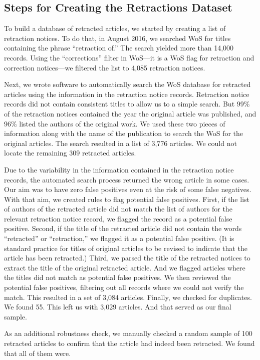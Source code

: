 \documentclass[12pt]{article}
\begin{document}
\subsection{Steps for Creating the Retractions Dataset}
\label{data_collection}
To build a database of retracted articles, we started by creating a list of retraction notices. To do that, in August 2016, we searched WoS for titles containing the phrase ``retraction of.'' The search yielded more than 14,000 records. Using the ``corrections'' filter in WoS---it is a WoS flag for retraction and correction notices---we filtered the list to 4,085 retraction notices.

Next, we wrote software to automatically search the WoS database for retracted articles using the information in the retraction notice records. Retraction notice records did not contain consistent titles to allow us to a simple search. But 99\% of the retraction notices contained the year the original article was published, and 96\% listed the authors of the original work. We used these two pieces of information along with the name of the publication to search the WoS for the original articles. The search resulted in a list of 3,776 articles. We could not locate the remaining 309 retracted articles.

Due to the variability in the information contained in the retraction notice records, the automated search process returned the wrong article in some cases. Our aim was to have zero false positives even at the risk of some false negatives. With that aim, we created rules to flag potential false positives. First, if the list of authors of the retracted article did not match the list of authors for the relevant retraction notice record, we flagged the record as a potential false positive. Second, if the title of the retracted article did not contain the words ``retracted'' or ``retraction,'' we flagged it as a potential false positive. (It is standard practice for titles of original articles to be revised to indicate that the article has been retracted.) Third, we parsed the title of the retracted notices to extract the title of the original retracted article. And we flagged articles where the titles did not match as potential false positives. We then reviewed the potential false positives, filtering out all records where we could not verify the match. This resulted in a set of 3,084 articles. Finally, we checked for duplicates. We found 55. This left us with 3,029 articles. And that served as our final sample. 

As an additional robustness check, we manually checked a random sample of 100 retracted articles to confirm that the article had indeed been retracted. We found that all of them were.
\end{document}
